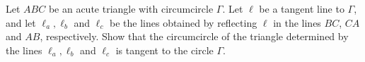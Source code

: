Let $ABC$ be an acute triangle with circumcircle $\Gamma$. Let $\ell$ be a tangent line to $\Gamma$,  and let $\ell_a, \ell_b$ and $\ell_c$ be the lines obtained by reflecting $\ell$ in the lines $BC$,  $CA$ and $AB$,  respectively. Show that the circumcircle of the triangle determined by the lines $\ell_a, \ell_b$ and $\ell_c$ is tangent to the circle $\Gamma$.